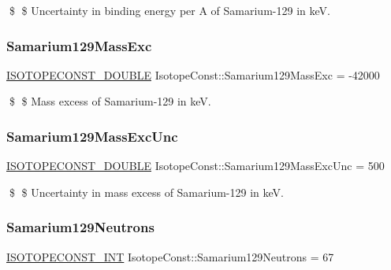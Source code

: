 \$ \$ Uncertainty in binding energy per A of Samarium-\/129 in keV. \mbox{\label{group___isotope_const-_samarium-_sm129_ga1ced3083558f30e41c3567e7f0b0fc36}} 
\subsubsection{\texorpdfstring{Samarium129\+Mass\+Exc}{Samarium129MassExc}}
{\footnotesize\ttfamily \mbox{\hyperlink{group___isotope_const-_macros_ga8f45a7272ce02c0b4c65c44636ed719a}{I\+S\+O\+T\+O\+P\+E\+C\+O\+N\+S\+T\+\_\+\+D\+O\+U\+B\+LE}} Isotope\+Const\+::\+Samarium129\+Mass\+Exc = -\/42000}

\$ \$ Mass excess of Samarium-\/129 in keV. \mbox{\label{group___isotope_const-_samarium-_sm129_ga11c653950a2c678aaf7892d33b8ee8ad}} 
\subsubsection{\texorpdfstring{Samarium129\+Mass\+Exc\+Unc}{Samarium129MassExcUnc}}
{\footnotesize\ttfamily \mbox{\hyperlink{group___isotope_const-_macros_ga8f45a7272ce02c0b4c65c44636ed719a}{I\+S\+O\+T\+O\+P\+E\+C\+O\+N\+S\+T\+\_\+\+D\+O\+U\+B\+LE}} Isotope\+Const\+::\+Samarium129\+Mass\+Exc\+Unc = 500}

\$ \$ Uncertainty in mass excess of Samarium-\/129 in keV. \mbox{\label{group___isotope_const-_samarium-_sm129_gafc47fc56a60d19de1e0c624530ca49be}} 
\subsubsection{\texorpdfstring{Samarium129\+Neutrons}{Samarium129Neutrons}}
{\footnotesize\ttfamily \mbox{\hyperlink{group___isotope_const-_macros_ga5f18360b3e99483a35c32d789e62621c}{I\+S\+O\+T\+O\+P\+E\+C\+O\+N\+S\+T\+\_\+\+I\+NT}} Isotope\+Const\+::\+Samarium129\+Neutrons = 67}

